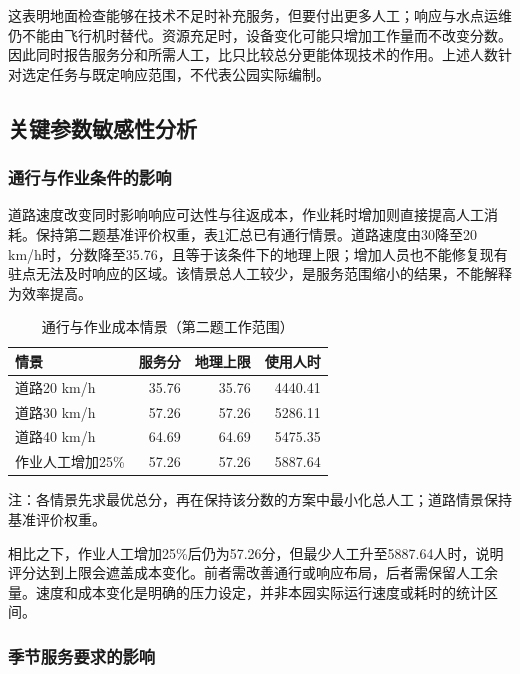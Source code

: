 \documentclass[UTF8,fontset=fandol,12pt,a4paper]{ctexart}
\begin{document}
这表明地面检查能够在技术不足时补充服务，但要付出更多人工；响应与水点运维仍不能由飞行机时替代。资源充足时，设备变化可能只增加工作量而不改变分数。因此同时报告服务分和所需人工，比只比较总分更能体现技术的作用。上述人数针对选定任务与既定响应范围，不代表公园实际编制。

\subsection{关键参数敏感性分析}

\subsubsection{通行与作业条件的影响}

道路速度改变同时影响响应可达性与往返成本，作业耗时增加则直接提高人工消耗。保持第二题基准评价权重，表\ref{tab:travel}汇总已有通行情景。道路速度由30降至20 km/h时，分数降至35.76，且等于该条件下的地理上限；增加人员也不能修复现有驻点无法及时响应的区域。该情景总人工较少，是服务范围缩小的结果，不能解释为效率提高。

\begin{table}[htbp]
\centering\small
\caption{通行与作业成本情景（第二题工作范围）}
\label{tab:travel}
\begin{tabular}{lrrr}
\toprule
情景 & 服务分 & 地理上限 & 使用人时 \\
\midrule
道路20 km/h & 35.76 & 35.76 & 4440.41 \\
道路30 km/h & 57.26 & 57.26 & 5286.11 \\
道路40 km/h & 64.69 & 64.69 & 5475.35 \\
作业人工增加25\% & 57.26 & 57.26 & 5887.64 \\
\bottomrule
\end{tabular}
\par\smallskip\begin{minipage}{\linewidth}\footnotesize 注：各情景先求最优总分，再在保持该分数的方案中最小化总人工；道路情景保持基准评价权重。\end{minipage}
\end{table}

相比之下，作业人工增加25\%后仍为57.26分，但最少人工升至5887.64人时，说明评分达到上限会遮盖成本变化。前者需改善通行或响应布局，后者需保留人工余量。速度和成本变化是明确的压力设定，并非本园实际运行速度或耗时的统计区间。

\subsubsection{季节服务要求的影响}
\end{document}
